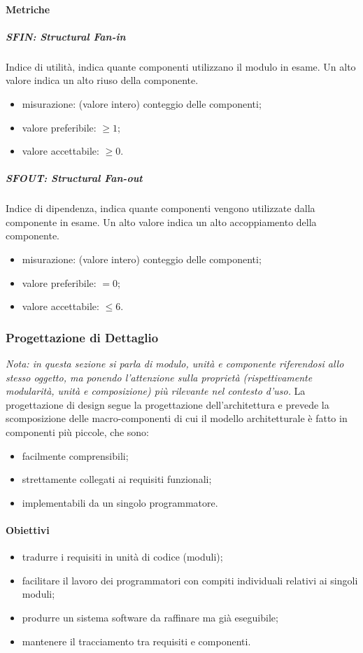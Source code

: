 		\paragraph{Metriche}
			\subparagraph{SFIN: Structural Fan-in}
			Indice di utilità, indica quante componenti utilizzano il modulo in esame. Un alto valore indica un alto riuso della componente.
			\begin{itemize}
				\item misurazione: (valore intero) conteggio delle componenti;
				\item valore preferibile: $ \geq 1$;
				\item valore accettabile: $ \geq 0$.
			\end{itemize}
			\subparagraph{SFOUT: Structural Fan-out}
			Indice di dipendenza, indica quante componenti vengono utilizzate dalla componente in esame. Un alto valore indica un alto
accoppiamento della componente.
			\begin{itemize}
				\item misurazione: (valore intero) conteggio delle componenti;
				\item valore preferibile: $ = 0$;
				\item valore accettabile: $ \leq 6$.
			\end{itemize}
			
	\subsubsection{Progettazione di Dettaglio}
	\textit{Nota: in questa sezione si parla di modulo, unità e componente riferendosi allo stesso oggetto, ma ponendo l'attenzione sulla proprietà (rispettivamente modularità, unità e composizione) più rilevante nel contesto d'uso.}\newline 
	La progettazione di design segue la progettazione dell'architettura e prevede la scomposizione delle macro-componenti di cui il modello architetturale è fatto in componenti più piccole, che sono:
	\begin{itemize}
		\item facilmente comprensibili;
		\item strettamente collegati ai requisiti funzionali;
		\item implementabili da un singolo programmatore.
	\end{itemize}
		\paragraph{Obiettivi}
		\begin{itemize}
			\item tradurre i requisiti in unità di codice (moduli);
			\item facilitare il lavoro dei programmatori con compiti individuali relativi ai singoli moduli;
			\item produrre un sistema software da raffinare ma già eseguibile;
			\item mantenere il tracciamento tra requisiti e componenti.
		\end{itemize}

